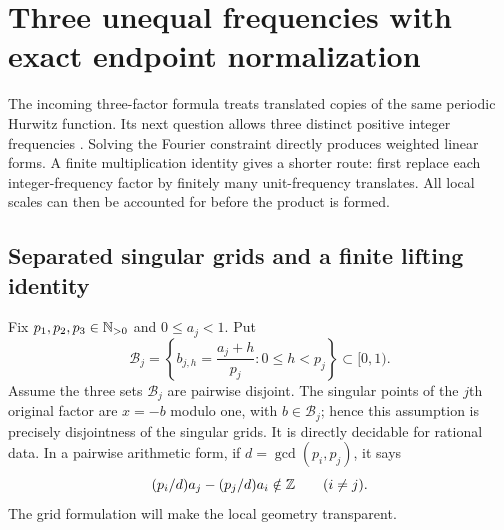 \section{Three unequal frequencies with exact endpoint normalization}
\label{tr:section}

The incoming three-factor formula treats translated copies of the same
periodic Hurwitz function. Its next question allows three distinct positive
integer frequencies \cite{incoming-sh}. Solving the Fourier constraint
directly produces weighted linear forms. A finite multiplication identity
gives a shorter route: first replace each integer-frequency factor by
finitely many unit-frequency translates. All local scales can then be
accounted for before the product is formed.

\subsection{Separated singular grids and a finite lifting identity}
Fix $p_1,p_2,p_3\in\mathbb N_{>0}$ and $0\leq a_j<1$. Put
\begin{equation}\label{tr:grids}
 \mathcal B_j=\left\{b_{j,h}=\frac{a_j+h}{p_j}:
                       0\leq h<p_j\right\}\subset[0,1).
\end{equation}
Assume the three sets $\mathcal B_j$ are pairwise disjoint. The singular
points of the $j$th original factor are $x=-b$ modulo one, with
$b\in\mathcal B_j$; hence this assumption is precisely disjointness of
the singular grids. It is directly decidable for rational data. In a
pairwise arithmetic form, if $d=\gcd(p_i,p_j)$, it says
\[
 (p_i/d)a_j-(p_j/d)a_i\notin\mathbb Z\qquad(i\ne j).
\]
The grid formulation will make the local geometry transparent.

